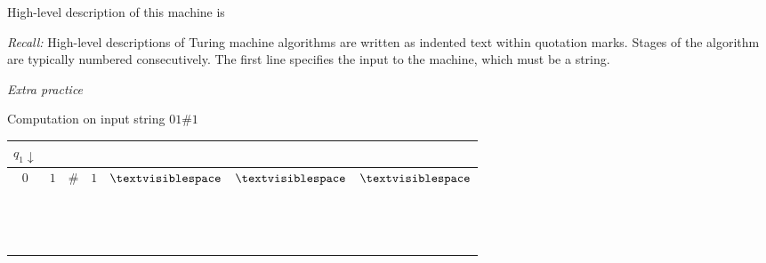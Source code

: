 \documentclass[12pt, oneside]{article}
\begin{document}
\begin{multicols}{2}
High-level description of this machine is

\vfill


{\it Recall:} 
High-level descriptions of  Turing machine algorithms are written as indented text within quotation marks.   
Stages of the algorithm are typically numbered consecutively.
The first line specifies the input to the machine, which must be a string.

\columnbreak

{\it Extra practice}

Computation on  input  string  $01\#1$

\begin{tabular}{|c|c|c|c|c|c|c|}
\hline
\multicolumn{1}{|c}{$q_1\downarrow$} &  \multicolumn{6}{c|}{\phantom{A}}\\
\hline
$0$ & $1$  & $\#$  & $1$ & $\textvisiblespace $& $\textvisiblespace $&  $\textvisiblespace $\\
\hline
\multicolumn{7}{|c|}{\phantom{A}}\\
\hline
\phantom{AA} & \phantom{AA}& \phantom{AA}& \phantom{AA}& \phantom{AA}& \phantom{AA}& \phantom{AA} \\
\hline
\multicolumn{7}{|c|}{\phantom{A}}\\
\hline
\phantom{AA} & \phantom{AA}& \phantom{AA}& \phantom{AA}& \phantom{AA}& \phantom{AA}& \phantom{AA} \\
\hline
\multicolumn{7}{|c|}{\phantom{A}}\\
\hline
\phantom{AA} & \phantom{AA}& \phantom{AA}& \phantom{AA}& \phantom{AA}& \phantom{AA}& \phantom{AA} \\
\hline
\multicolumn{7}{|c|}{\phantom{A}}\\
\hline
\phantom{AA} & \phantom{AA}& \phantom{AA}& \phantom{AA}& \phantom{AA}& \phantom{AA}& \phantom{AA} \\
\hline
\multicolumn{7}{|c|}{\phantom{A}}\\
\hline
\phantom{AA} & \phantom{AA}& \phantom{AA}& \phantom{AA}& \phantom{AA}& \phantom{AA}& \phantom{AA} \\
\hline
\multicolumn{7}{|c|}{\phantom{A}}\\
\hline
\phantom{AA} & \phantom{AA}& \phantom{AA}& \phantom{AA}& \phantom{AA}& \phantom{AA}& \phantom{AA} \\
\hline
\multicolumn{7}{|c|}{\phantom{A}}\\
\hline
\phantom{AA} & \phantom{AA}& \phantom{AA}& \phantom{AA}& \phantom{AA}& \phantom{AA}& \phantom{AA} \\

\end{tabular}
\end{multicols}
\end{document}
